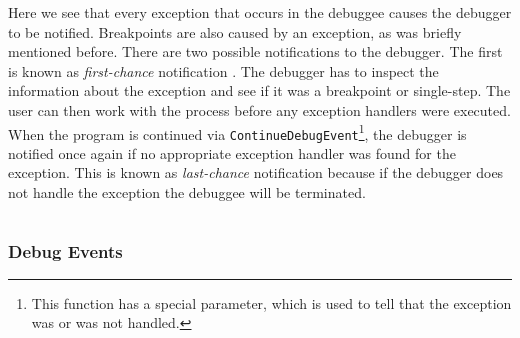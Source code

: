Here we see that every exception that occurs in the debuggee causes the debugger to be notified. Breakpoints are also caused by an exception, as was briefly mentioned before. There are two possible notifications to the debugger. The first is known as \textit{first-chance} notification \cite{windows-msdn-dbg-exc-handling}. The debugger has to inspect the information about the exception and see if it was a breakpoint or single-step. The user can then work with the process before any exception handlers were executed. When the program is continued via \lstinline{ContinueDebugEvent}\footnote{This function has a special parameter, which is used to tell that the exception was or was not handled.}, the debugger is notified once again if no appropriate exception handler was found for the exception. This is known as \textit{last-chance} notification because if the debugger does not handle the exception the debuggee will be terminated.

\begin{lstlisting}

\end{lstlisting}

\subsubsection*{Debug Events}

